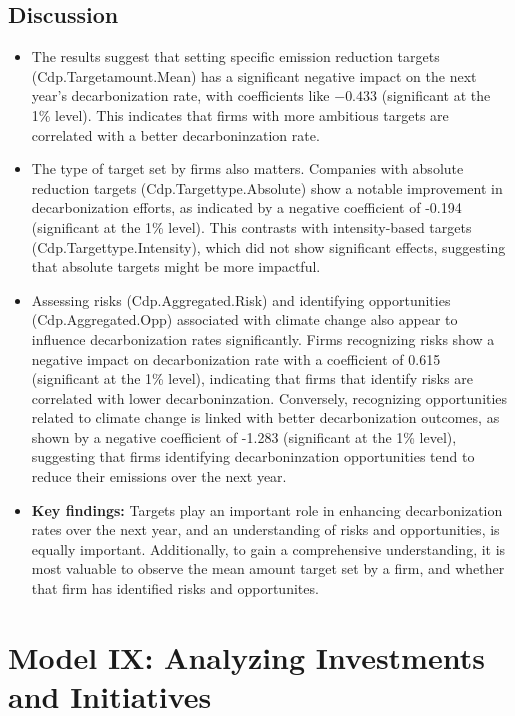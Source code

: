 \subsection{Discussion}
\begin{itemize}
\item The results suggest that setting specific emission reduction targets (Cdp.Targetamount.Mean) has a significant negative impact on the next year's decarbonization rate, with coefficients like $-0.433$ (significant at the 1\% level). This indicates that firms with more ambitious targets are correlated with a better decarboninzation rate.
\item The type of target set by firms also matters. Companies with absolute reduction targets (Cdp.Targettype.Absolute) show a notable improvement in decarbonization efforts, as indicated by a negative coefficient of -0.194 (significant at the 1\% level). This contrasts with intensity-based targets (Cdp.Targettype.Intensity), which did not show significant effects, suggesting that absolute targets might be more impactful.

\item Assessing risks (Cdp.Aggregated.Risk) and identifying opportunities (Cdp.Aggregated.Opp) associated with climate change also appear to influence decarbonization rates significantly. Firms recognizing risks show a negative impact on decarbonization rate with a coefficient of 0.615 (significant at the 1\% level), indicating that firms that identify risks are correlated with lower decarboninzation. Conversely, recognizing opportunities related to climate change is linked with better decarbonization outcomes, as shown by a negative coefficient of -1.283 (significant at the 1\% level), suggesting that firms identifying decarboninzation opportunities tend to reduce their emissions over the next year.

\item \textbf{Key findings:} Targets play an important role in enhancing decarbonization rates over the next year, and an understanding of risks and opportunities, is equally important. Additionally, to gain a comprehensive understanding, it is most valuable to observe the mean amount target set by a firm, and whether that firm has identified risks and opportunites.

\end{itemize}

\section{Model IX: Analyzing Investments and Initiatives}

